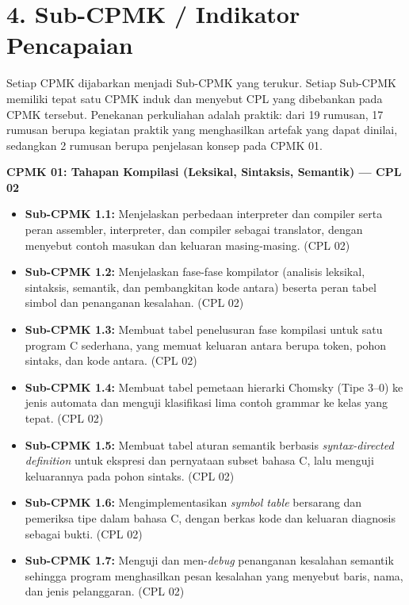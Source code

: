 \documentclass[12pt,a4paper]{article}
\begin{document}
\vspace{0.5cm}

\section*{4. Sub-CPMK / Indikator Pencapaian}

Setiap CPMK dijabarkan menjadi Sub-CPMK yang terukur. Setiap Sub-CPMK memiliki tepat satu CPMK induk dan menyebut CPL yang dibebankan pada CPMK tersebut. Penekanan perkuliahan adalah praktik: dari 19 rumusan, 17 rumusan berupa kegiatan praktik yang menghasilkan artefak yang dapat dinilai, sedangkan 2 rumusan berupa penjelasan konsep pada CPMK 01.

\noindent\textbf{CPMK 01: Tahapan Kompilasi (Leksikal, Sintaksis, Semantik) --- CPL 02}
\begin{itemize}[leftmargin=*]
  \item \textbf{Sub-CPMK 1.1:} Menjelaskan perbedaan interpreter dan compiler serta peran assembler, interpreter, dan compiler sebagai translator, dengan menyebut contoh masukan dan keluaran masing-masing. (CPL 02)
  \item \textbf{Sub-CPMK 1.2:} Menjelaskan fase-fase kompilator (analisis leksikal, sintaksis, semantik, dan pembangkitan kode antara) beserta peran tabel simbol dan penanganan kesalahan. (CPL 02)
  \item \textbf{Sub-CPMK 1.3:} Membuat tabel penelusuran fase kompilasi untuk satu program C sederhana, yang memuat keluaran antara berupa token, pohon sintaks, dan kode antara. (CPL 02)
  \item \textbf{Sub-CPMK 1.4:} Membuat tabel pemetaan hierarki Chomsky (Tipe 3--0) ke jenis automata dan menguji klasifikasi lima contoh grammar ke kelas yang tepat. (CPL 02)
  \item \textbf{Sub-CPMK 1.5:} Membuat tabel aturan semantik berbasis \textit{syntax-directed definition} untuk ekspresi dan pernyataan subset bahasa C, lalu menguji keluarannya pada pohon sintaks. (CPL 02)
  \item \textbf{Sub-CPMK 1.6:} Mengimplementasikan \textit{symbol table} bersarang dan pemeriksa tipe dalam bahasa C, dengan berkas kode dan keluaran diagnosis sebagai bukti. (CPL 02)
  \item \textbf{Sub-CPMK 1.7:} Menguji dan men-\textit{debug} penanganan kesalahan semantik sehingga program menghasilkan pesan kesalahan yang menyebut baris, nama, dan jenis pelanggaran. (CPL 02)
\end{itemize}
\end{document}
